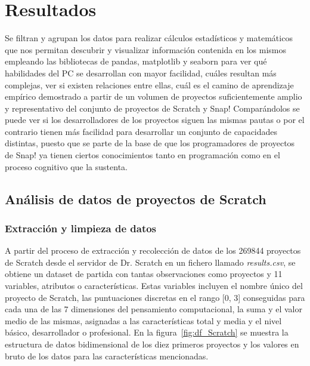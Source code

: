 \documentclass[a4paper, 12pt]{book}
\begin{document}

\cleardoublepage
\chapter{Resultados}
\label{chap:resultados}

Se filtran y agrupan los datos para realizar cálculos estadísticos y matemáticos que nos permitan descubrir y visualizar información contenida en los mismos empleando las bibliotecas de pandas, matplotlib y seaborn para ver qué habilidades del PC se desarrollan con mayor facilidad, cuáles resultan más complejas, ver si existen relaciones entre ellas, cuál es el camino de aprendizaje empírico demostrado a partir de un volumen de proyectos suficientemente amplio y representativo del conjunto de proyectos de Scratch y Snap! Comparándolos se puede ver si los desarrolladores de los proyectos siguen las mismas pautas o por el contrario tienen más facilidad para desarrollar un conjunto de capacidades distintas, puesto que se parte de la base de que los programadores de proyectos de Snap! ya tienen ciertos conocimientos tanto en programación como en el proceso cognitivo que la sustenta.

\section{Análisis de datos de proyectos de Scratch} 
\label{sec:result_scratch}

\subsection{Extracción y limpieza de datos}
\label{subsec:clean_data_Scratch}

A partir del proceso de extracción y recolección de datos de los 269844 proyectos de Scratch desde el servidor de Dr. Scratch en un fichero llamado \emph{results.csv}, se obtiene un dataset de partida con tantas observaciones como proyectos y 11 variables, atributos o características. Estas variables incluyen el nombre único del proyecto de Scratch, las puntuaciones discretas en el rango [0, 3] conseguidas para cada una de las 7 dimensiones del pensamiento computacional, la suma y el valor medio de las mismas, asignadas a las características total y media y el nivel básico, desarrollador o profesional. En la figura~\ref{fig:df_Scratch} se muestra la estructura de datos bidimensional de los diez primeros proyectos y los valores en bruto de los datos para las características mencionadas. 
\end{document}
